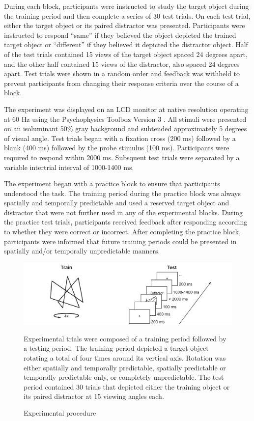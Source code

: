 \documentclass[dwyatte_dissertation.tex]{subfiles}
\begin{document}
During each block, participants were instructed to study the target object during the training period and then complete a series of 30 test trials. On each test trial, either the target object or its paired distractor was presented. Participants were instructed to respond ``same'' if they believed the object depicted the trained target object or ``different'' if they believed it depicted the distractor object. Half of the test trials contained 15 views of the target object spaced 24 degrees apart, and the other half contained 15 views of the distractor, also spaced 24 degrees apart. Test trials were shown in a random order and feedback was withheld to prevent participants from changing their response criteria over the course of a block. 

The experiment was displayed on an LCD monitor at native resolution operating at 60 Hz using the Psychophysics Toolbox Version 3 \cite{Brainard97,Pelli97}. All stimuli were presented on an isoluminant 50\% gray background and subtended approximately 5 degrees of visual angle. Test trials began with a fixation cross (200 ms) followed by a blank (400 ms) followed by the probe stimulus (100 ms). Participants were required to respond within 2000 ms. Subsquent test trials were separated by a variable intertrial interval of 1000-1400 ms.

The experiment began with a practice block to ensure that participants understood the task. The training period during the practice block was always spatially and temporally predictable and used a reserved target object and distractor that were not further used in any of the experimental blocks. During the practice test trials, participants received feedback after responding according to whether they were correct or incorrect. After completing the practice block, participants were informed that future training periods could be presented in spatially and/or temporally unpredictable manners.

\begin{figure}[h!]
\includegraphics[width=160mm]{figs/chap_bpleast/paperclip_task.pdf} \\
\caption{Experimental procedure}{Experimental trials were composed of a training period followed by a testing period. The training period depicted a target object rotating a total of four times around its vertical axis. Rotation was either spatially and temporally predictable, spatially predictable or temporally predictable only, or completely unpredictable. The test period contained 30 trials that depicted either the training object or its paired distractor at 15 viewing angles each.}
\label{fig:bpleast_task}
\end{figure}
\end{document}
